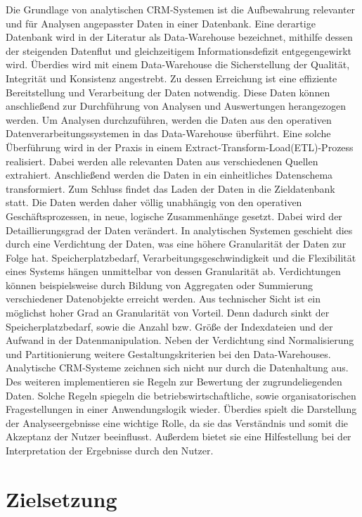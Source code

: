 Die Grundlage von analytischen CRM-Systemen ist die Aufbewahrung relevanter und für Analysen angepasster Daten in einer Datenbank. Eine derartige Datenbank wird in der Literatur als Data-Warehouse bezeichnet, mithilfe dessen der steigenden Datenflut und gleichzeitigem Informationsdefizit entgegengewirkt wird. Überdies wird mit einem Data-Warehouse die Sicherstellung der Qualität, Integrität und Konsistenz angestrebt. Zu dessen Erreichung ist eine effiziente Bereitstellung und Verarbeitung der Daten notwendig. Diese Daten können anschließend zur Durchführung von Analysen und Auswertungen herangezogen werden. Um Analysen durchzuführen, werden die Daten aus den operativen Datenverarbeitungssystemen in das Data-Warehouse überführt. Eine solche Überführung wird in der Praxis in einem Extract-Transform-Load(ETL)-Prozess realisiert. Dabei werden alle relevanten Daten aus verschiedenen Quellen extrahiert. Anschließend werden die Daten in ein einheitliches Datenschema transformiert. Zum Schluss findet das Laden der Daten in die Zieldatenbank statt. 
Die Daten werden daher völlig unabhängig von den operativen Geschäftsprozessen, in neue, logische Zusammenhänge gesetzt. Dabei wird der Detaillierungsgrad der Daten verändert. In analytischen Systemen geschieht dies durch eine Verdichtung der Daten, was eine höhere Granularität der Daten zur Folge hat. Speicherplatzbedarf,  Verarbeitungsgeschwindigkeit und die Flexibilität eines Systems hängen unmittelbar von dessen Granularität ab. Verdichtungen können beispielsweise durch Bildung von Aggregaten oder Summierung verschiedener Datenobjekte erreicht werden. Aus technischer Sicht ist ein möglichst hoher Grad an Granularität von Vorteil. Denn dadurch sinkt der Speicherplatzbedarf, sowie die Anzahl bzw. Größe der Indexdateien und der Aufwand in der Datenmanipulation. Neben der Verdichtung sind Normalisierung und Partitionierung weitere Gestaltungskriterien bei den Data-Warehouses. Analytische CRM-Systeme zeichnen sich nicht nur durch die Datenhaltung aus. Des weiteren implementieren sie Regeln zur Bewertung der zugrundeliegenden Daten. Solche Regeln spiegeln die betriebswirtschaftliche, sowie organisatorischen Fragestellungen in einer Anwendungslogik wieder. Überdies spielt die Darstellung der Analyseergebnisse eine wichtige Rolle, da sie das Verständnis und somit die Akzeptanz der Nutzer beeinflusst. Außerdem bietet sie eine Hilfestellung bei der Interpretation der Ergebnisse durch den Nutzer.

\section{Zielsetzung}
\label{ch:Einfuehrung:sec:Zielsetzung}

